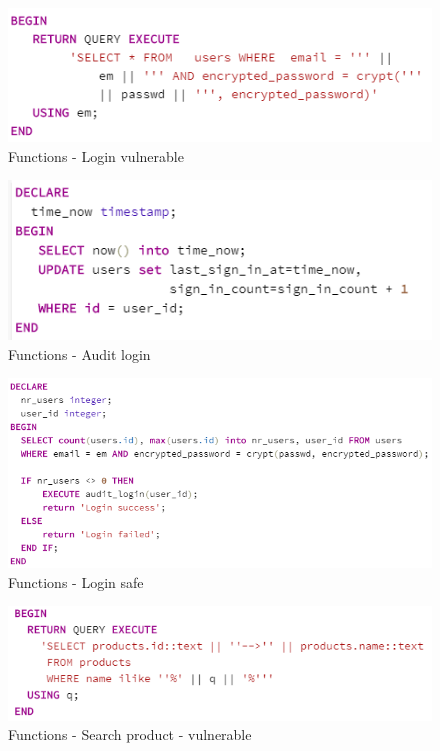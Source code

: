 \documentclass{article}
\begin{document}
\begin{figure}
\centering
\includegraphics[scale=1]{f1}
\caption{Functions - Login vulnerable}
\end{figure}
\begin{figure}
\centering
\includegraphics[scale=1]{f2}
\caption{Functions - Audit login}
\end{figure} 
\begin{figure}
\centering
\includegraphics[scale=1]{f3}
\caption{Functions - Login safe}
\end{figure}
\begin{figure}
\centering
\includegraphics[scale=1]{f4}
\caption{Functions - Search product - vulnerable}
\end{figure}
\end{document}
